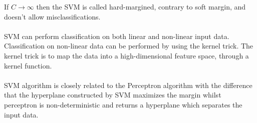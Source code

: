 If $C \rightarrow \infty$ then the SVM is called hard-margined, contrary to soft margin, and doesn't allow misclassifications.
\\\\
SVM can perform classification on both linear and non-linear input data. Classification on non-linear data can be performed by using the kernel trick. The kernel trick is to map the data into a high-dimensional feature space, through a kernel function. \citep{svm_ai}
\\\\
SVM algorithm is closely related to the Perceptron algorithm with the difference that the hyperplane constructed by SVM maximizes the margin whilst perceptron is non-deterministic and returns a hyperplane which separates the input data.
